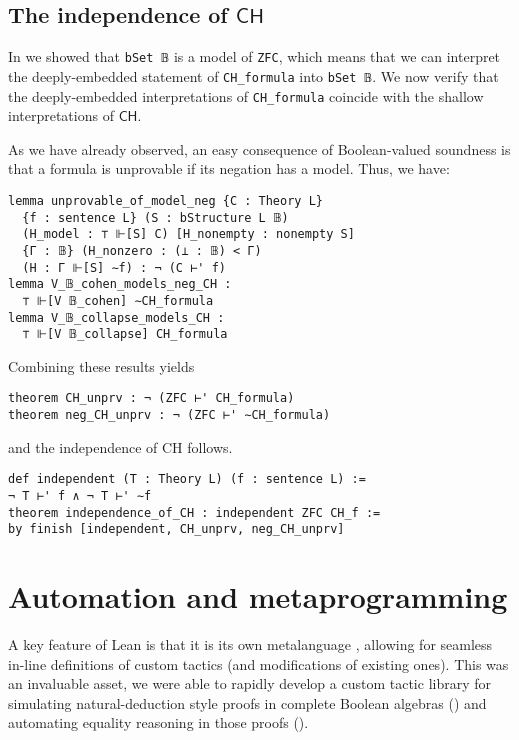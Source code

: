 \documentclass[sigplan,10pt,review]{acmart}
\newcommand{\lil}{\lstinline}
\newcommand{\CH}{\mathsf{CH}}
\theoremstyle{definition}
\begin{document}


\subsection{The independence of \(\CH\)} \label{subsect:forcing:independence}

In  we showed that \lil{bSet 𝔹} is a model of \lil{ZFC},
which means that we can interpret the deeply-embedded statement of \lil{CH_formula} into
\lil{bSet 𝔹}.
We now verify that the deeply-embedded interpretations of \lil{CH_formula} coincide with the shallow interpretations of \(\mathsf{CH}\).

As we have already observed, an easy consequence of Boolean-valued soundness is that a formula is unprovable if its negation has a model. Thus, we have:
\begin{lstlisting}
lemma unprovable_of_model_neg {C : Theory L}
  {f : sentence L} (S : bStructure L 𝔹)
  (H_model : ⊤ ⊩[S] C) [H_nonempty : nonempty S]
  {Γ : 𝔹} (H_nonzero : (⊥ : 𝔹) < Γ)
  (H : Γ ⊩[S] ∼f) : ¬ (C ⊢' f)
lemma V_𝔹_cohen_models_neg_CH :
  ⊤ ⊩[V 𝔹_cohen] ∼CH_formula
lemma V_𝔹_collapse_models_CH :
  ⊤ ⊩[V 𝔹_collapse] CH_formula
\end{lstlisting}
\noindent Combining these results yields
\begin{lstlisting}
theorem CH_unprv : ¬ (ZFC ⊢' CH_formula)
theorem neg_CH_unprv : ¬ (ZFC ⊢' ∼CH_formula)
\end{lstlisting}
\noindent and the independence of CH follows.
\begin{lstlisting}
def independent (T : Theory L) (f : sentence L) :=
¬ T ⊢' f ∧ ¬ T ⊢' ∼f
theorem independence_of_CH : independent ZFC CH_f :=
by finish [independent, CH_unprv, neg_CH_unprv]
\end{lstlisting}
\section{Automation and metaprogramming}
\label{sect:metaprogramming}

A key feature of Lean is that it is its own metalanguage \cite{Ebner:2017:MFF:3136534.3110278}, allowing for seamless in-line definitions of custom tactics (and modifications of existing ones).
This was an invaluable asset, we were able to rapidly develop a custom tactic library for simulating natural-deduction style proofs in complete Boolean algebras () and automating equality reasoning in those proofs ().
\end{document}
